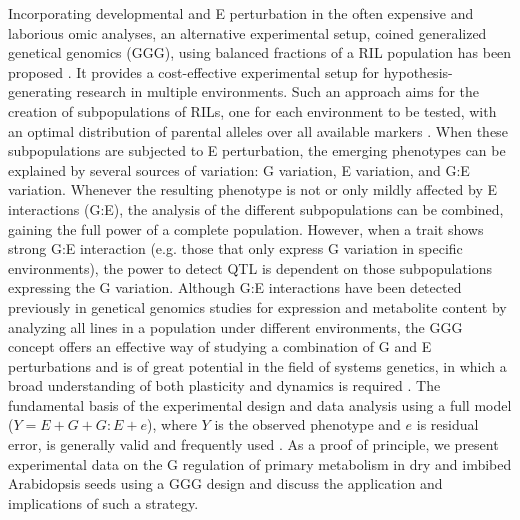 Incorporating developmental and E  perturbation in the often expensive and laborious omic analyses, an 
alternative experimental setup, coined generalized genetical genomics (GGG), using balanced fractions 
of a RIL population has been proposed \cite{Li:2009}. It provides a cost-effective experimental setup 
for hypothesis-generating research in multiple environments. Such an approach aims for the creation of 
subpopulations of RILs, one for each environment to be tested, with an optimal distribution of parental 
alleles over all available markers \cite{Li:2009}. When these subpopulations are subjected to E 
perturbation, the emerging phenotypes can be explained by several sources of variation: G variation, 
E variation, and G:E variation. Whenever the resulting phenotype is not or only mildly affected by E 
interactions (G:E), the analysis of the different subpopulations can be combined, gaining the full power 
of a complete population. However, when a trait shows strong G:E interaction (e.g. those that only express 
G variation in specific environments), the power to detect QTL is dependent on those subpopulations 
expressing the G variation. Although G:E interactions have been detected previously in genetical 
genomics studies for expression \cite{Li:2006, Smith:2008, Gerrits:2009} and metabolite content 
\cite{Zhu:2012} by analyzing all lines in a population under different environments, the GGG concept 
offers an effective way of studying a combination of G and E perturbations and is of great potential 
in the field of systems genetics, in which a broad understanding of both plasticity and dynamics is 
required \cite{Li:2008}. The fundamental basis of the experimental design and data analysis using a 
full model ($Y = E + G + G:E + e$), where $Y$ is the observed phenotype and $e$ is residual error, 
is generally valid and frequently used \cite{Churchill:2002, Li:2006,Gerrits:2009}. As a proof of 
principle, we present experimental data on the G regulation of primary metabolism in dry and imbibed 
Arabidopsis seeds using a GGG design and discuss the application and implications of such a strategy.

